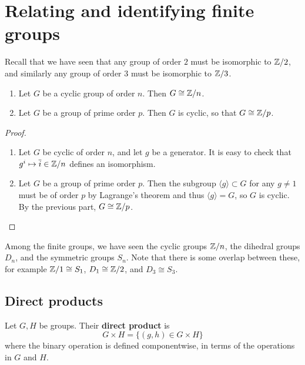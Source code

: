 \chapter{Relating and identifying finite groups}

Recall that we have seen that any group of order $2$ must be isomorphic to $\mathbb{Z}/2$,
and similarly any group of order $3$ must be isomorphic to $\mathbb{Z}/3$.

\begin{lemma}[]
    \hfill
    \begin{enumerate}
        \item Let $G$ be a cyclic group of order $n$.
            Then $G \cong \mathbb{Z}/n$.

        \item Let $G$ be a group of prime order $p$.
            Then $G$ is cyclic, so that $G \cong \mathbb{Z}/p$.
    \end{enumerate}
\end{lemma}

\begin{proof}
    \hfill
    \begin{enumerate}
        \item Let $G$ be cyclic of order $n$, and let $g$ be a generator.
            It is easy to check that $g^i \mapsto \overline i \in \mathbb{Z}/n$
            defines an isomorphism.

        \item Let $G$ be a group of prime order $p$.
            Then the subgroup $\langle g \rangle \subset G$
            for any $g \neq 1$ must be of order $p$ by Lagrange's theorem
            and thus $\langle g \rangle = G$, so $G$ is cyclic.
            By the previous part, $G \cong \mathbb{Z}/p$.
    \end{enumerate}
\end{proof}

Among the finite groups, we have seen 
the cyclic groups $\mathbb{Z}/n$, 
the dihedral groups $D_n$, and
the symmetric groups $S_n$.
Note that there is some overlap between these, for example 
$\mathbb{Z}/1 \cong S_1$, $D_1 \cong \mathbb{Z}/2$, and $D_3 \cong S_3$.

\section{Direct products}

\begin{definition}
    Let $G,H$ be groups.
    Their \textbf{direct product} is
    \[
        G \times H = \{(g,h) \in G \times H\}
    \]
    where the binary operation is defined componentwise, 
    in terms of the operations in $G$ and $H$.
\end{definition}

